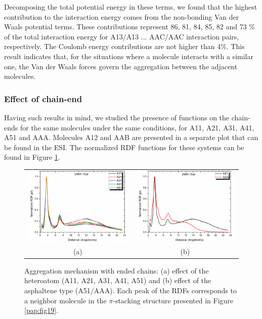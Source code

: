 Decomposing the total potential energy in these terms, we found that the highest contribution to the interaction energy comes from the non-bonding Van der Waals potential terms. These contributions represent 86, 81, 84, 85, 82 and 73 \% of the total interaction energy for A13/A13 ... AAC/AAC interaction pairs, respectively. The Coulomb energy contributions are not higher than 4\%. This result indicates that, for the situations where a molecule interacts with a similar one, the Van der Waals forces govern the aggregation between the adjacent molecules. 

\subsubsection{Effect of chain-end}

Having such results in mind, we studied the presence of  functions on the chain-ends for the same molecules under the same conditions, for A11, A21, A31, A41, A51 and AAA. Molecules A12 and AAB are presented in a separate plot that can be found in the ESI. The normalized RDF functions for these systems can be found in Figure \ref{pap:fig20}.

\begin{figure}[h]
	\begin{tabular}{cc}
		\includegraphics[width=0.45\columnwidth]{image/04a} & 	
		\includegraphics[width=0.45\columnwidth]{image/04b} \\
		(a) & (b) \\
	\end{tabular}
	\caption{Aggregation mechanism with  ended chains: (a) effect of the heteroatom (A11, A21, A31, A41, A51)  and (b) effect of the asphaltene type (A51/AAA). Each peak of the RDFs corresponds to a neighbor molecule in the $\pi$-stacking structure presented in Figure \ref{pap:fig19}.}
	\label{pap:fig20}
\end{figure}

